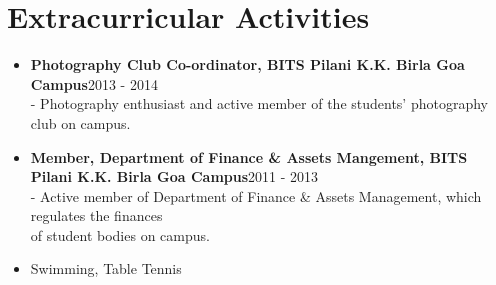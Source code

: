 \documentclass{article}
\begin{document}
\section*{Extracurricular Activities}
\begin{itemize}
    \item \textbf{Photography Club Co-ordinator, BITS Pilani K.K. Birla Goa Campus}{\hfill 2013 - 2014}\\
    - Photography enthusiast and active member of the students' photography club on campus.
    
    \item \textbf{Member, Department of Finance \& Assets Mangement, BITS Pilani K.K. Birla Goa Campus}{\hfill 2011 - 2013}\\
    - Active member of Department of Finance \& Assets Management, which regulates the finances\\
    \hspace*{0.7em}of student bodies on campus.
    
    \item Swimming, Table Tennis
\end{itemize}
\end{document}
